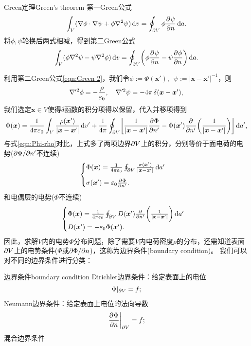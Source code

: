 \begin{theorem}{Green定理}{Green's theorem}
    第一Green公式
    \begin{equation}
        \label{eqn:Green 1}
        \int_V(\nabla\phi\cdot\nabla\psi+\phi\nabla^2\psi)\mathop{}\!\mathrm{d} v=\oint_{\partial V}\phi\frac{\partial^{{}}\psi}{\partial{n}^{{}}}\mathop{}\!\mathrm{d} a.
    \end{equation}
    将$\phi,\psi$轮换后两式相减，得到第二Green公式
    \begin{equation}
        \label{eqn:Green 2}
        \int_V(\phi\nabla^2\psi-\psi\nabla^2\phi)\mathop{}\!\mathrm{d} v=\oint_{\partial V}\biggl(\phi\frac{\partial^{{}}\psi}{\partial{n}^{{}}}-\psi\frac{\partial^{{}}\phi}{\partial{n}^{{}}}\biggr)\mathop{}\!\mathrm{d} a.
    \end{equation}
\end{theorem}

利用第二Green公式\eqref{eqn:Green 2}，我们令$\phi:=\Phi(\bm x'),\enspace\psi:=|\bm x-\bm x'|^{-1}$，则
\[
    \nabla'^2\phi=-\frac{\rho}{\varepsilon_0},\quad\nabla'^2\psi=-4\pi\mathop{}\!\delta(\bm x-\bm x'),
\]
我们选定$\bm x\in V$使得$\delta$函数的积分项得以保留，代入并移项得到
\begin{equation}
    \label{eqn:Phi-rho with boundary}
        \Phi(\bm x)=\frac1{4\pi\varepsilon_0}\int_V\frac{\rho(\bm x')}{|\bm x-\bm x'|}\mathop{}\!\mathrm{d} v'+\frac1{4\pi}\oint_{\partial V}\biggl[\frac1{|\bm x-\bm x'|}\frac{\partial^{{}}\Phi}{\partial{n'}^{{}}}-\Phi(\bm x')\frac{\partial^{{}}}{\partial{n'}^{{}}}\biggl(\frac1{|\bm x-\bm x'|}\biggr)\biggr]\mathop{}\!\mathrm{d} a',
\end{equation}
与式\eqref{eqn:Phi-rho}对比，上式多了两项边界$\partial V$上的积分，分别等价于面电荷的电势($\partial\Phi/\partial n'$不连续)
\[
    \begin{cases}
        \Phi(\bm x)=\frac1{4\pi\varepsilon_0}\oint_{\partial V}\frac{\sigma(\bm x')}{|\bm x-\bm x'|}\mathop{}\!\mathrm{d} a'\\[2ex]
        \sigma(\bm x')=\varepsilon_0\frac{\partial^{{}}\Phi}{\partial{n'}^{{}}}.
    \end{cases}
\]
和电偶层的电势($\Phi$不连续)
\[
    \begin{cases}
        \Phi(\bm x)=\frac1{4\pi\varepsilon_0}\oint_{\partial V}D(\bm x')\frac{\partial^{{}}}{\partial{n'}^{{}}}\biggl(\frac1{|\bm x-\bm x'|}\biggr)\mathop{}\!\mathrm{d} a'\\
        D(\bm x')=-\varepsilon_0\Phi(\bm x').
    \end{cases}
\]
因此，求解$V$内的电势$\Phi$分布问题，除了需要$V$内电荷密度$\rho$的分布，还需知道表面$\partial V$上的电势条件($\Phi$或$\partial\Phi/\partial n$)，这称为边界条件(boundary condition)。
我们可以对不同的边界条件进行分类：
\begin{definition}{边界条件}{boundary condition}
    Dirichlet边界条件：给定表面上的电位
    \[
        \Phi|_{\partial V}=f;
    \]
    Neumann边界条件：给定表面上电位的法向导数
    \[
        \left.\frac{\partial^{{}}\Phi}{\partial{n}^{{}}}\right\rvert_{\partial V}=f;
    \]
    混合边界条件
\end{definition}

